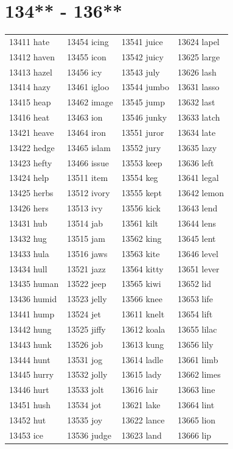 \documentclass[10pt, oneside]{book}
\begin{document}
\begin{table}
	\centering
	\section*{134** - 136**}
	\begin{tabular}{l l l l}
13411 hate &13454 icing &13541 juice &13624 lapel\\
13412 haven &13455 icon &13542 juicy &13625 large\\
13413 hazel &13456 icy &13543 july &13626 lash\\
13414 hazy &13461 igloo &13544 jumbo &13631 lasso\\
13415 heap &13462 image &13545 jump &13632 last\\
13416 heat &13463 ion &13546 junky &13633 latch\\
13421 heave &13464 iron &13551 juror &13634 late\\
13422 hedge &13465 islam &13552 jury &13635 lazy\\
13423 hefty &13466 issue &13553 keep &13636 left\\
13424 help &13511 item &13554 keg &13641 legal\\
13425 herbs &13512 ivory &13555 kept &13642 lemon\\
13426 hers &13513 ivy &13556 kick &13643 lend\\
13431 hub &13514 jab &13561 kilt &13644 lens\\
13432 hug &13515 jam &13562 king &13645 lent\\
13433 hula &13516 jaws &13563 kite &13646 level\\
13434 hull &13521 jazz &13564 kitty &13651 lever\\
13435 human &13522 jeep &13565 kiwi &13652 lid\\
13436 humid &13523 jelly &13566 knee &13653 life\\
13441 hump &13524 jet &13611 knelt &13654 lift\\
13442 hung &13525 jiffy &13612 koala &13655 lilac\\
13443 hunk &13526 job &13613 kung &13656 lily\\
13444 hunt &13531 jog &13614 ladle &13661 limb\\
13445 hurry &13532 jolly &13615 lady &13662 limes\\
13446 hurt &13533 jolt &13616 lair &13663 line\\
13451 hush &13534 jot &13621 lake &13664 lint\\
13452 hut &13535 joy &13622 lance &13665 lion\\
13453 ice &13536 judge &13623 land &13666 lip\\
	\end{tabular}
 \end{table}
\clearpage
\end{document}
